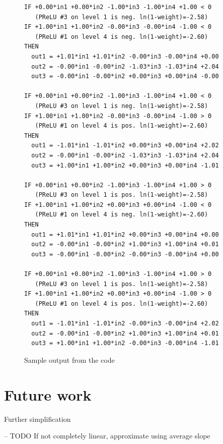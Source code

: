 \documentclass{article}[12pt]
\begin{document}
\begin{figure}[ht]
\begin{verbatim}
IF +0.00*in1 +0.00*in2 -1.00*in3 -1.00*in4 +1.00 < 0
   (PReLU #3 on level 1 is neg. ln(1-weight)=-2.58)  
IF +1.00*in1 +1.00*in2 -0.00*in3 -0.00*in4 -1.00 < 0
   (PReLU #1 on level 4 is neg. ln(1-weight)=-2.60)  
THEN    
  out1 = +1.01*in1 +1.01*in2 -0.00*in3 -0.00*in4 +0.00  
  out2 = -0.00*in1 -0.00*in2 -1.03*in3 -1.03*in4 +2.04  
  out3 = -0.00*in1 -0.00*in2 +0.00*in3 +0.00*in4 -0.00  
        
IF +0.00*in1 +0.00*in2 -1.00*in3 -1.00*in4 +1.00 < 0
   (PReLU #3 on level 1 is neg. ln(1-weight)=-2.58)  
IF +1.00*in1 +1.00*in2 -0.00*in3 -0.00*in4 -1.00 > 0
   (PReLU #1 on level 4 is pos. ln(1-weight)=-2.60)  
THEN    
  out1 = -1.01*in1 -1.01*in2 +0.00*in3 +0.00*in4 +2.02  
  out2 = -0.00*in1 -0.00*in2 -1.03*in3 -1.03*in4 +2.04  
  out3 = +1.00*in1 +1.00*in2 +0.00*in3 +0.00*in4 -1.01  
        
IF +0.00*in1 +0.00*in2 -1.00*in3 -1.00*in4 +1.00 > 0
   (PReLU #3 on level 1 is pos. ln(1-weight)=-2.58)  
IF +1.00*in1 +1.00*in2 +0.00*in3 +0.00*in4 -1.00 < 0
   (PReLU #1 on level 4 is neg. ln(1-weight)=-2.60)  
THEN    
  out1 = +1.01*in1 +1.01*in2 +0.00*in3 +0.00*in4 +0.00  
  out2 = -0.00*in1 -0.00*in2 +1.00*in3 +1.00*in4 +0.01  
  out3 = -0.00*in1 -0.00*in2 -0.00*in3 -0.00*in4 +0.00  
        
IF +0.00*in1 +0.00*in2 -1.00*in3 -1.00*in4 +1.00 > 0
   (PReLU #3 on level 1 is pos. ln(1-weight)=-2.58)  
IF +1.00*in1 +1.00*in2 +0.00*in3 +0.00*in4 -1.00 > 0
   (PReLU #1 on level 4 is pos. ln(1-weight)=-2.60)  
THEN    
  out1 = -1.01*in1 -1.01*in2 -0.00*in3 -0.00*in4 +2.02  
  out2 = -0.00*in1 -0.00*in2 +1.00*in3 +1.00*in4 +0.01  
  out3 = +1.00*in1 +1.00*in2 -0.00*in3 -0.00*in4 -1.01
\end{verbatim}
\caption{Sample output from the code}
\label{output}
\end{figure}

\section{Future work}

Further simplification

-- TODO If not completely linear, approximate using average slope
\end{document}
